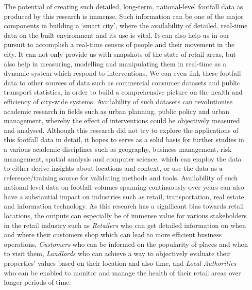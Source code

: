 The potential of creating such detailed, long-term, national-level footfall data as produced by this research is immense.
Such information can be one of the major components in building a `smart city', where the availability of detailed, real-time data on the built environment and its use is vital.
It can also help us in our pursuit to accomplish a real-time census of people and their movement in the city.
It can not only provide us with snapshots of the state of  retail areas, but also help in measuring, modelling and manipulating them in real-time as a dynamic system which respond to interventions.
We can even link these footfall data to other sources of data such as commercial consumer datasets and public transport statistics, in order to build a comprehensive picture on the health and efficiency of city-wide systems.
Availability of such datasets can revolutionise academic research in fields such as urban planning, public policy and urban management, whereby the effect of interventions could be objectively measured and analysed.
Although this research did not try to explore the applications of this footfall data in detail, it hopes to serve as a solid basis for further studies in a various academic disciplines such as geography, business management, risk management, spatial analysis and computer science, which can employ the data to either derive insights about locations and context, or use the data as a reference/training source for validating methods and tools.
Availability of such national level data on footfall volumes spanning continuously over years can also have a substantial impact on industries such as retail, transportation, real estate and information technology.
As this research has a significant bias towards retail locations, the outputs can especially be of immense value for various stakeholders in the retail industry such as \textit{Retailers} who can get detailed information on when and where their customers shop which can lead to more efficient business operations, \textit{Customers} who can be informed on the popularity of places and when to visit them, \textit{Landlords} who can achieve a way to objectively evaluate their properties' values based on their location and also time, and \textit{Local Authorities} who can be enabled to monitor and manage the health of their retail areas over longer periods of time.
